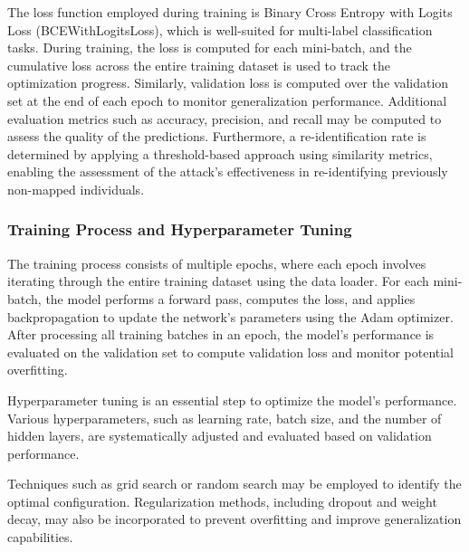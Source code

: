 The loss function employed during training is Binary Cross Entropy with Logits Loss (BCEWithLogitsLoss), which is well-suited for multi-label classification tasks.
During training, the loss is computed for each mini-batch, and the cumulative loss across the entire training dataset is used to track the optimization progress.
Similarly, validation loss is computed over the validation set at the end of each epoch to monitor generalization performance.
Additional evaluation metrics such as accuracy, precision, and recall may be computed to assess the quality of the predictions.
Furthermore, a re-identification rate is determined by applying a threshold-based approach using similarity metrics, enabling the assessment of the attack’s effectiveness in re-identifying previously non-mapped individuals.

\subsubsection{Training Process and Hyperparameter Tuning}

The training process consists of multiple epochs, where each epoch involves iterating through the entire training dataset using the data loader.
For each mini-batch, the model performs a forward pass, computes the loss, and applies backpropagation to update the network’s parameters using the Adam optimizer.
After processing all training batches in an epoch, the model’s performance is evaluated on the validation set to compute validation loss and monitor potential overfitting.

Hyperparameter tuning is an essential step to optimize the model’s performance.
Various hyperparameters, such as learning rate, batch size, and the number of hidden layers, are systematically adjusted and evaluated based on validation performance.

Techniques such as grid search or random search may be employed to identify the optimal configuration. Regularization methods, including dropout and weight decay, may also be incorporated to prevent overfitting and improve generalization capabilities.




